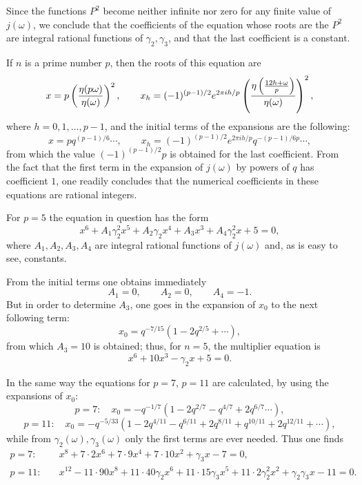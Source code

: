 \documentclass[11pt]{article}
\begin{document}
Since the functions $P^2$ become neither infinite nor zero for any finite value of $j(\omega)$, we conclude that the coefficients of the equation whose roots are the $P^2$ are integral rational functions of $\gamma_2,\gamma_3$, and that the last coefficient is a constant.

If $n$ is a prime number $p$, then the roots of this equation are
\[
 x=p\left({\eta(p\omega)\over\eta(\omega)}\right)^2,
 \qquad
 x_h=(-1)^{(p-1)/2}e^{2\pi i h/p}\left({\eta\left({12h+\omega\over p}\right)
 \over\eta(\omega)}\right)^2,
\]
where $h=0,1,\ldots,p-1$, and the initial terms of the expansions are the following:
\[
 x=pq^{(p-1)/6}\cdots,
 \qquad
 x_h=(-1)^{(p-1)/2}e^{2\pi ih/p}q^{-(p-1)/6p}\cdots,
\]
from which the value $(-1)^{(p-1)/2}p$ is obtained for the last coefficient. From the fact that the first term in the expansion of $j(\omega)$ by powers of $q$ has coefficient $1$, one readily concludes that the numerical coefficients in these equations are rational integers.

For $p=5$ the equation in question has the form
\[
 x^6+A_1\gamma_2^2x^5+A_2\gamma_2x^4+A_3x^3+A_4\gamma_2^2x+5=0,
\]
where $A_1,A_2,A_3,A_4$ are integral rational functions of $j(\omega)$ and, as is easy to see, constants.

From the initial terms one obtains immediately
\[
 A_1=0,
 \qquad A_2=0,
 \qquad A_4=-1.
\]
But in order to determine $A_3$, one goes in the expansion of $x_0$ to the next following term:
\[
 x_0=q^{-7/15}(1-2q^{2/5}+\cdots),
\]
from which $A_3=10$ is obtained; thus, for $n=5$, the multiplier equation is
\begin{equation}
 x^6+10x^3-\gamma_2x+5=0.
\tag{8}
\end{equation}

In the same way the equations for $p=7$, $p=11$ are calculated, by using the expansions of $x_0$:
\[
 p=7:\quad x_0=-q^{-1/7}(1-2q^{2/7}-q^{4/7}+2q^{6/7}\cdots),
\]
\[
 p=11:\quad x_0=-q^{-5/33}(1-2q^{4/11}-q^{6/11}+2q^{8/11}+q^{10/11}+2q^{12/11}+\cdots),
\]
while from $\gamma_2(\omega),\gamma_3(\omega)$ only the first terms are ever needed. Thus one finds
\begin{align}
 p=7:\quad& x^8+7\cdot2x^6+7\cdot9x^4+7\cdot10x^2+\gamma_3x-7=0,
\tag{9}\\
 p=11:\quad& x^{12}-11\cdot90x^8+11\cdot40\gamma_2x^6+11\cdot15\gamma_3x^5
 +11\cdot2\gamma_2^2x^2+\gamma_2\gamma_3x-11=0.
\tag{10}
\end{align}
\end{document}
